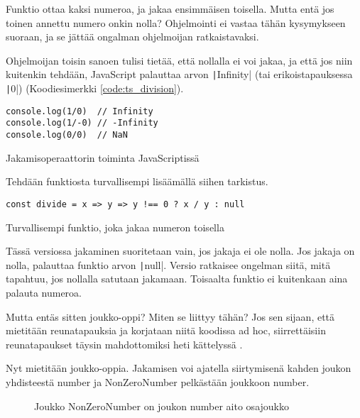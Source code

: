 Funktio ottaa kaksi numeroa, ja jakaa ensimmäisen toisella. Mutta entä jos toinen annettu numero onkin nolla? Ohjelmointi ei vastaa tähän kysymykseen suoraan, ja se jättää ongalman ohjelmoijan ratkaistavaksi.

Ohjelmoijan toisin sanoen tulisi tietää, että nollalla ei voi jakaa, ja että jos niin kuitenkin tehdään, JavaScript palauttaa arvon \texttt|Infinity| (tai erikoistapauksessa \texttt|0|) (Koodiesimerkki \ref{code:ts_division}).

\begin{code}
	\begin{verbatim}
console.log(1/0)  // Infinity
console.log(1/-0) // -Infinity
console.log(0/0)  // NaN
\end{verbatim}
	\caption{Jakamisoperaattorin toiminta JavaScriptissä}
	\label{code:ts_division}
\end{code}

Tehdään funktiosta turvallisempi lisäämällä siihen tarkistus.


\begin{code}
	\begin{verbatim}
const divide = x => y => y !== 0 ? x / y : null
\end{verbatim}
	\caption{Turvallisempi funktio, joka jakaa numeron toisella}
	\label{code:ts_set_theory_4}
\end{code}

Tässä versiossa jakaminen suoritetaan vain, jos jakaja ei ole nolla. Jos jakaja on nolla, palauttaa funktio arvon \texttt|null|. Versio ratkaisee ongelman siitä, mitä tapahtuu, jos nollalla satutaan jakamaan. Toisaalta funktio ei kuitenkaan aina palauta numeroa.

Mutta entäs sitten joukko-oppi? Miten se liittyy tähän? Jos sen sijaan, että mietitään reunatapauksia ja korjataan niitä koodissa ad hoc, siirrettäisiin reunatapaukset täysin mahdottomiksi heti kättelyssä \cite{impossiblebetter}.

Nyt mietitään joukko-oppia. Jakamisen voi ajatella siirtymisenä kahden joukon yhdisteestä number ja NonZeroNumber pelkästään joukkoon number.

\begin{figure}[ht]
	\centering
	\caption{Joukko NonZeroNumber on joukon number aito osajoukko}
	\label{fig:set-esimerkki}
\end{figure}

